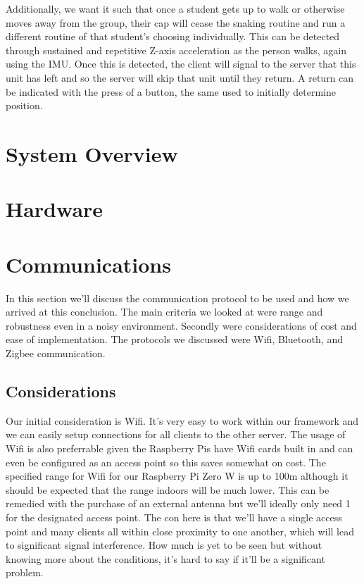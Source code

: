 \documentclass[12pt,letterpaper]{article}
\begin{document}
    Additionally, we want it such that once a student gets up to walk or otherwise moves away from the group, their cap will cease the snaking routine and run a different routine of that student's choosing individually. This can be detected through sustained and repetitive Z-axis acceleration as the person walks, again using the IMU. Once this is detected, the client will signal to the server that this unit has left and so the server will skip that unit until they return. A return can be indicated with the press of a button, the same used to initially determine position. 




\section {System Overview}

\section {Hardware}


\section {Communications}
In this section we'll discuss the communication protocol to be used and how we arrived at this conclusion. The main criteria we looked at were range and robustness even in a noisy environment. Secondly were considerations of cost and ease of implementation. The protocols we discussed were Wifi, Bluetooth, and Zigbee communication. 

    \subsection{Considerations}
    Our initial consideration is Wifi. It's very easy to work within our framework and we can easily setup connections for all clients to the other server. The usage of Wifi is also preferrable given the Raspberry Pis have Wifi cards built in and can even be configured as an access point so this saves somewhat on cost. The specified range for Wifi for our Raspberry Pi Zero W is up to 100m although it should be expected that the range indoors will be much lower. This can be remedied with the purchase of an external antenna but we'll ideally only need 1 for the designated access point. The con here is that we'll have a single access point and many clients all within close proximity to one another, which will lead to significant signal interference. How much is yet to be seen but without knowing more about the conditions, it's hard to say if it'll be a significant problem. 
\end{document}
